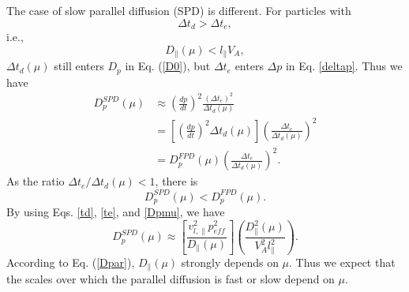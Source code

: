 \documentclass[preprint2,twocolumn,times,tighten]{aastex63}
\begin{document}
{ The case of {slow parallel diffusion (SPD)} is different.  For particles with
\begin{equation}
    \Delta t_d > \Delta t_e,
    \label{ne}
\end{equation}
i.e.,
\begin{equation}
    D_\| (\mu) < l_\| V_A,
    \label{leq}
\end{equation}
{$\Delta t_d (\mu)$ still enters $D_p$
in Eq. (\ref{D0}),
but $\Delta t_e$ enters $\Delta p$ in Eq. \eqref{deltap}.}
Thus we have 
\begin{equation}
\begin{aligned}
    D_p^{SPD} (\mu) &\approx \left(\frac{dp}{dt}\right)^2 \frac{(\Delta t_e)^2}{\Delta t_d (\mu)}  \\
  &  =\left[ \left(\frac{dp}{dt}\right)^2 \Delta t_d (\mu)\right]\left(\frac{\Delta t_e}{\Delta t_d (\mu)}\right)^2\\
  &  = D_p^{FPD}(\mu) \left(\frac{\Delta t_e}{\Delta t_d (\mu)}\right)^2.
    \label{Dslow0}
\end{aligned}
\end{equation}
As the ratio $\Delta t_e / \Delta t_d(\mu) <1$,
there is 
\begin{equation}
    D_p^{SPD} (\mu) < D_p^{FPD} (\mu).
\end{equation}
By using Eqs. \eqref{td}, \eqref{te}, and \eqref{Dpmu}, we have 
\begin{equation}
    D_p^{SPD} (\mu) \approx \left[ \frac{v_{l,\|}^2 p_{eff}^2}{ D_\| (\mu)}\right]\left(\frac{D_\|^2 (\mu)}{V_A^2 l_\|^2}\right).
    \label{Dslow1}
\end{equation}
According to Eq. (\ref{Dpar}), $D_{\|} (\mu)$ strongly depends on $\mu$. 
Thus we expect that the scales over which the parallel diffusion is fast or slow 
depend on $\mu$. 




}
\end{document}
